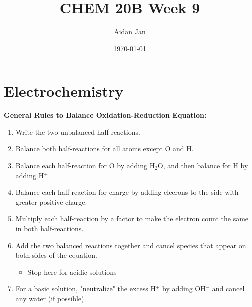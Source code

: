 \documentclass[10pt]{article}
\title{CHEM 20B Week 9}
\author{Aidan Jan}
\date{\today}
\begin{document}
\maketitle
\section*{Electrochemistry}
\textbf{General Rules to Balance Oxidation-Reduction Equation:}\
\begin{enumerate}
    \item Write the two unbalanced half-reactions.
    \item Balance both half-reactions for all atoms except O and H.
    \item Balance each half-reaction for O by adding H$_2$O, and then balance for H by adding H$^+$.
    \item Balance each half-reaction for charge by adding elecrons to the side with greater positive charge.
    \item Multiply each half-reaction by a factor to make the electron count the same in both half-reactions.
    \item Add the two balanced reactions together and cancel species that appear on both sides of the equation.
    \begin{itemize}
        \item Stop here for acidic solutions
    \end{itemize}
    \item For a basic solution, "neutralize" the excess H$^+$ by adding OH$^-$ and cancel any water (if possible).
\end{enumerate}
\end{document}
